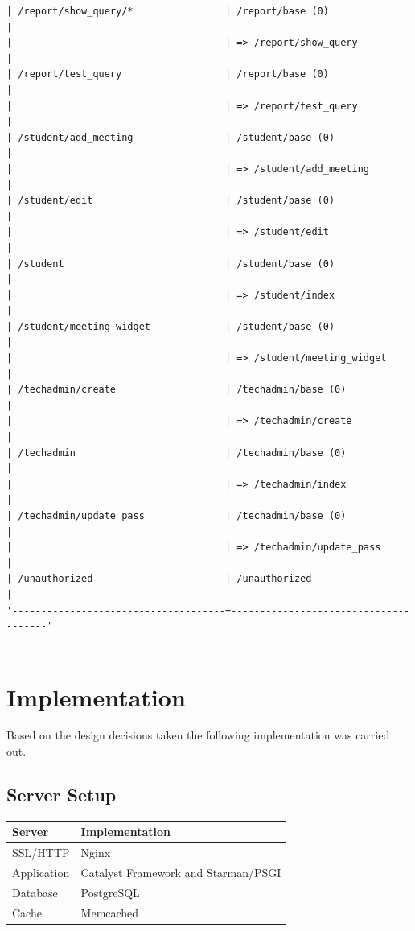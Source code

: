 \documentclass{journal}
\begin{document}
\begin{verbatim}
| /report/show_query/*                | /report/base (0)                     |
|                                     | => /report/show_query                |
| /report/test_query                  | /report/base (0)                     |
|                                     | => /report/test_query                |
| /student/add_meeting                | /student/base (0)                    |
|                                     | => /student/add_meeting              |
| /student/edit                       | /student/base (0)                    |
|                                     | => /student/edit                     |
| /student                            | /student/base (0)                    |
|                                     | => /student/index                    |
| /student/meeting_widget             | /student/base (0)                    |
|                                     | => /student/meeting_widget           |
| /techadmin/create                   | /techadmin/base (0)                  |
|                                     | => /techadmin/create                 |
| /techadmin                          | /techadmin/base (0)                  |
|                                     | => /techadmin/index                  |
| /techadmin/update_pass              | /techadmin/base (0)                  |
|                                     | => /techadmin/update_pass            |
| /unauthorized                       | /unauthorized                        |
'-------------------------------------+--------------------------------------'


\end{verbatim}

\section{Implementation}
Based on the design decisions taken the following implementation was carried out. 

\subsection{Server Setup}

\begin{tabular}{| l | l |}
\hline
Server & Implementation \\
\hline
SSL/HTTP & Nginx \\
Application & Catalyst Framework and Starman/PSGI \\
Database & PostgreSQL \\
Cache & Memcached \\
\hline 

\end{tabular}
\end{document}
